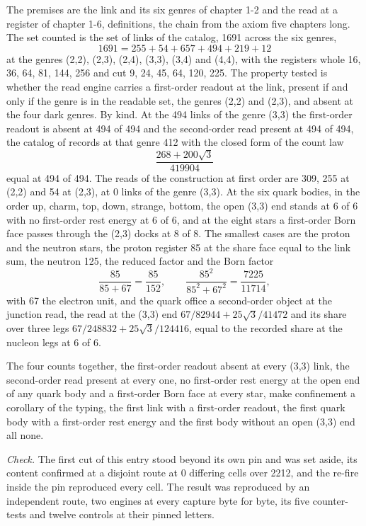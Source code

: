 \begin{chproof}[census]
The premises are the link and its six genres of chapter 1-2 and the read at a register of chapter 1-6, definitions, the chain from the axiom five chapters long. The set counted is the set of links of the catalog, 1691 across the six genres,
\begin{equation}
1691 = 255 + 54 + 657 + 494 + 219 + 12
\end{equation}
at the genres (2,2), (2,3), (2,4), (3,3), (3,4) and (4,4), with the registers whole 16, 36, 64, 81, 144, 256 and cut 9, 24, 45, 64, 120, 225. The property tested is whether the read engine carries a first-order readout at the link, present if and only if the genre is in the readable set, the genres (2,2) and (2,3), and absent at the four dark genres. By kind. At the 494 links of the genre (3,3) the first-order readout is absent at 494 of 494 and the second-order read present at 494 of 494, the catalog of records at that genre 412 with the closed form of the count law
\begin{equation}
\frac{268 + 200\sqrt{3}}{419904}
\end{equation}
equal at 494 of 494. The reads of the construction at first order are 309, 255 at (2,2) and 54 at (2,3), at 0 links of the genre (3,3). At the six quark bodies, in the order up, charm, top, down, strange, bottom, the open (3,3) end stands at 6 of 6 with no first-order rest energy at 6 of 6, and at the eight stars a first-order Born face passes through the (2,3) docks at 8 of 8. The smallest cases are the proton and the neutron stars, the proton register 85 at the share face equal to the link sum, the neutron 125, the reduced factor and the Born factor
\begin{equation}
\frac{85}{85 + 67} = \frac{85}{152}, \qquad \frac{85^{2}}{85^{2} + 67^{2}} = \frac{7225}{11714},
\end{equation}
with 67 the electron unit, and the quark office a second-order object at the junction read, the read at the (3,3) end $67/82944 + 25\sqrt{3}/41472$ and its share over three legs $67/248832 + 25\sqrt{3}/124416$, equal to the recorded share at the nucleon legs at 6 of 6.

The four counts together, the first-order readout absent at every (3,3) link, the second-order read present at every one, no first-order rest energy at the open end of any quark body and a first-order Born face at every star, make confinement a corollary of the typing, the first link with a first-order readout, the first quark body with a first-order rest energy and the first body without an open (3,3) end all none.

\emph{Check.} The first cut of this entry stood beyond its own pin and was set aside, its content confirmed at a disjoint route at 0 differing cells over 2212, and the re-fire inside the pin reproduced every cell. The result was reproduced by an independent route, two engines at every capture byte for byte, its five counter-tests and twelve controls at their pinned letters.
\end{chproof}

